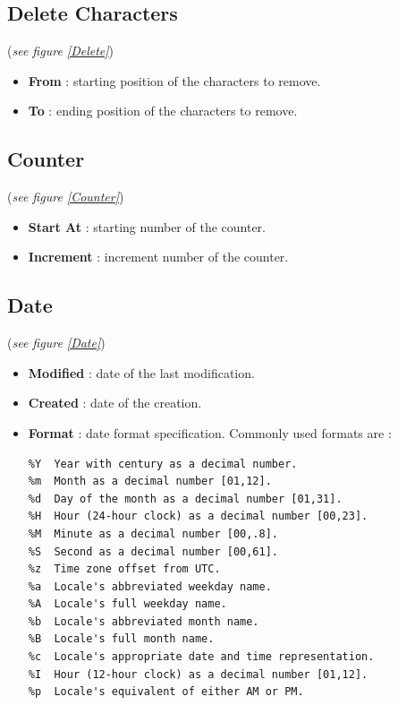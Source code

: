 \documentclass[11pt, a4paper]{scrartcl}
\begin{document}
\subsection*{Delete Characters}
(\emph{see figure \ref{Delete}})\\

\begin{itemize}
        \item \textbf{From} : starting position of the characters to remove.
        \item \textbf{To} : ending position of the characters to remove.
\end{itemize}

\subsection*{Counter}
(\emph{see figure \ref{Counter}})\\

\begin{itemize}
        \item \textbf{Start At} : starting number of the counter. 
        \item \textbf{Increment} : increment number of the counter.
\end{itemize}

\subsection*{Date}
(\emph{see figure \ref{Date}})\\

\begin{itemize}
        \item \textbf{Modified} : date of the last modification.
        \item \textbf{Created} : date of the creation.
        \item \textbf{Format} : date format specification. Commonly used formats are :
                \begingroup
                \fontsize{8pt}{8pt}\selectfont
\begin{verbatim} 
%Y  Year with century as a decimal number.
%m  Month as a decimal number [01,12].
%d  Day of the month as a decimal number [01,31].
%H  Hour (24-hour clock) as a decimal number [00,23].
%M  Minute as a decimal number [00,.8].
%S  Second as a decimal number [00,61].
%z  Time zone offset from UTC.
%a  Locale's abbreviated weekday name.
%A  Locale's full weekday name.
%b  Locale's abbreviated month name.
%B  Locale's full month name.
%c  Locale's appropriate date and time representation.
%I  Hour (12-hour clock) as a decimal number [01,12].
%p  Locale's equivalent of either AM or PM.
\end{verbatim}
        \endgroup
\end{itemize}
\end{document}
